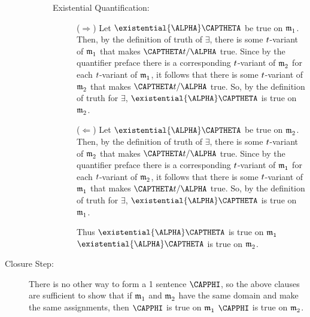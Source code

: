 \begin{PROOF}
\begin{description}
\begin{description}
\begin{description}
				\item[Existential Quantification:] ($\Rightarrow$) Let $\existential{\ALPHA}\CAPTHETA$ be true on $\mathfrak{m^{\mathrm{}}_{\mathrm{1}}}$.
				Then, by the definition of truth of $\exists$, there is some $t$-variant of $\mathfrak{m^{\mathrm{}}_{\mathrm{1}}}$ that makes $\CAPTHETA\variable{t}/\ALPHA$ true.
				Since by the quantifier preface there is a corresponding $t$-variant of $\mathfrak{m^{\mathrm{}}_{\mathrm{2}}}$ for each $t$-variant of $\mathfrak{m^{\mathrm{}}_{\mathrm{1}}}$, it follows that there is some $t$-variant of $\mathfrak{m^{\mathrm{}}_{\mathrm{2}}}$ that makes $\CAPTHETA\variable{t}/\ALPHA$ true.
				So, by the definition of truth for $\exists$, $\existential{\ALPHA}\CAPTHETA$ is true on $\mathfrak{m^{\mathrm{}}_{\mathrm{2}}}$.

				($\Leftarrow$) Let $\existential{\ALPHA}\CAPTHETA$ be true on $\mathfrak{m^{\mathrm{}}_{\mathrm{2}}}$.
				Then, by the definition of truth of $\exists$, there is some $t$-variant of $\mathfrak{m^{\mathrm{}}_{\mathrm{2}}}$ that makes $\CAPTHETA\variable{t}/\ALPHA$ true.
				Since by the quantifier preface there is a corresponding $t$-variant of $\mathfrak{m^{\mathrm{}}_{\mathrm{1}}}$ for each $t$-variant of $\mathfrak{m^{\mathrm{}}_{\mathrm{2}}}$, it follows that there is some $t$-variant of $\mathfrak{m^{\mathrm{}}_{\mathrm{1}}}$ that makes $\CAPTHETA\variable{t}/\ALPHA$ true.
				So, by the definition of truth for $\exists$, $\existential{\ALPHA}\CAPTHETA$ is true on $\mathfrak{m^{\mathrm{}}_{\mathrm{1}}}$.

				Thus $\existential{\ALPHA}\CAPTHETA$ is true on $\mathfrak{m^{\mathrm{}}_{\mathrm{1}}}$ \Iff $\existential{\ALPHA}\CAPTHETA$ is true on $\mathfrak{m^{\mathrm{}}_{\mathrm{2}}}$.
			\end{description}
			
		\end{description}
		\item[Closure Step:] There is no other way to form a \GQL{}1 sentence $\CAPPHI$, so the above clauses are sufficient to show that if $\mathfrak{m^{\mathrm{}}_{\mathrm{1}}}$ and $\mathfrak{m^{\mathrm{}}_{\mathrm{2}}}$ have the same domain and make the same assignments, then $\CAPPHI$ is true on $\mathfrak{m^{\mathrm{}}_{\mathrm{1}}}$ \Iff $\CAPPHI$ is true on $\mathfrak{m^{\mathrm{}}_{\mathrm{2}}}$.
	\end{description}
\end{PROOF}

